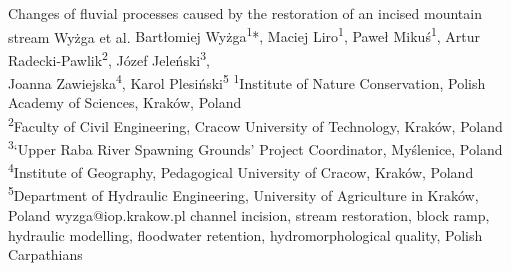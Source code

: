 \abstract
{Changes of fluvial processes caused by the restoration of an incised mountain stream} %
{Wyżga et al.} %
{Bartłomiej Wyżga\textsuperscript{1}*, Maciej Liro\textsuperscript{1}, Paweł Mikuś\textsuperscript{1}, Artur Radecki-Pawlik\textsuperscript{2}, Józef Jeleński\textsuperscript{3},\\Joanna Zawiejska\textsuperscript{4}, Karol Plesiński\textsuperscript{5}} %
{\TLtag} %
{\textsuperscript{1}Institute of Nature Conservation, Polish Academy of Sciences, Kraków, Poland\\
	\textsuperscript{2}Faculty of Civil Engineering, Cracow University of Technology, Kraków, Poland\\
	\textsuperscript{3}‘Upper Raba River Spawning Grounds’ Project Coordinator, Myślenice, Poland\\
	\textsuperscript{4}Institute of Geography, Pedagogical University of Cracow, Kraków, Poland\\
	\textsuperscript{5}Department of Hydraulic Engineering, University of Agriculture in Kraków, Poland
} %
{wyzga@iop.krakow.pl}  %
{channel incision, stream restoration, block ramp, hydraulic modelling, floodwater retention, hydromorphological quality, Polish Carpathians}%
